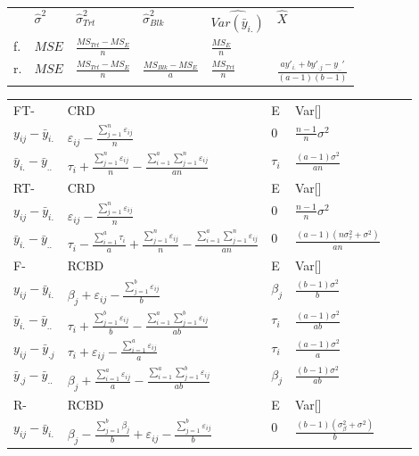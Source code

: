 \documentclass[10pt,portrait]{article}
\begin{document}
\begin{multicols}{2}
\begin{tabular}{l|l|l|l|l|l}
&$\hat\sigma^2$&$\hat\sigma_{Trt}^2$&$\hat\sigma_{Blk}^2$&$\widehat{Var(\bar y_{i.})}$&$\hat{X}$\\
f.&$MSE$&$\frac{MS_{Trt}-MS_{E}}{n}$&                           &$\frac{MS_{E}}{n}$&\\
r.&$MSE$&$\frac{MS_{Trt}-MS_{E}}{n}$&$\frac{MS_{Blk}-MS_{E}}{a}$&$\frac{MS_{Trt}}{n}$&$\frac{ay'_{i.}+by'_{.j}-y_{..}'}{(a-1)(b-1)}$\\
\end{tabular}


\begin{tabular}{l|l|l|l|l|l}
FT- &CRD & E & Var[]\\
$y_{ij}-\bar y_{i.}$ & $\varepsilon_{ij}-\frac{\sum_{j=1}^n\varepsilon_{ij}}n$ & $0$ & $\frac{n-1}n\sigma^2$\\
$\bar y_{i.}-\bar y_{..}$ & $\tau_{i}+\frac{\sum_{j=1}^n\varepsilon_{ij}}n-\frac{\sum_{i=1}^a\sum_{j=1}^n\varepsilon_{ij}}{an}$ & $\tau_i$ & $\frac{(a-1)\sigma^2}{an}$\\
\hline
RT- &CRD & E & Var[]\\
$y_{ij}-\bar y_{i.}$ & $\varepsilon_{ij}-\frac{\sum_{j=1}^n\varepsilon_{ij}}n$ & $0$ & $\frac{n-1}n\sigma^2$\\
$\bar y_{i.}-\bar y_{..}$ & $\tau_{i}-\frac{\sum_{i=1}^a\tau_{i}}{a}+\frac{\sum_{j=1}^n\varepsilon_{ij}}n-\frac{\sum_{i=1}^a\sum_{j=1}^n\varepsilon_{ij}}{an}$ & $0$ & $\frac{(a-1)(n\sigma_{\tau}^2+\sigma^2)}{an}$\\
\hline
F- &RCBD & E & Var[]\\
$y_{ij}-\bar y_{i.}$ & $\beta_{j}+\varepsilon_{ij}-\frac{\sum_{j=1}^b\varepsilon_{ij}}b$ & $\beta_j$ & $\frac{(b-1)\sigma^2}b$\\
$\bar y_{i.}-\bar y_{..}$ & $\tau_{i}+\frac{\sum_{j=1}^b\varepsilon_{ij}}b-\frac{\sum_{i=1}^a\sum_{j=1}^b\varepsilon_{ij}}{ab}$ & $\tau_i$ & $\frac{(a-1)\sigma^2}{ab}$\\
$y_{ij}-\bar y_{.j}$ & $\tau_{i}+\varepsilon_{ij}-\frac{\sum_{i=1}^a\varepsilon_{ij}}a$ & $\tau_i$ & $\frac{(a-1)\sigma^2}a$\\
$\bar y_{.j}-\bar y_{..}$ & $\beta_{j}+\frac{\sum_{i=1}^a\varepsilon_{ij}}a-\frac{\sum_{i=1}^a\sum_{j=1}^b\varepsilon_{ij}}{ab}$ & $\beta_j$ & $\frac{(b-1)\sigma^2}{ab}$\\
\hline
R- &RCBD & E & Var[]\\
$y_{ij}-\bar y_{i.}$ & $\beta_{j}-\frac{\sum_{j=1}^b\beta_{j}}b+\varepsilon_{ij}-\frac{\sum_{j=1}^b\varepsilon_{ij}}b$ & $0$ & $\frac{(b-1)(\sigma_{\beta}^2+\sigma^2)}b$\\

\end{tabular}
\end{multicols}
\end{document}

